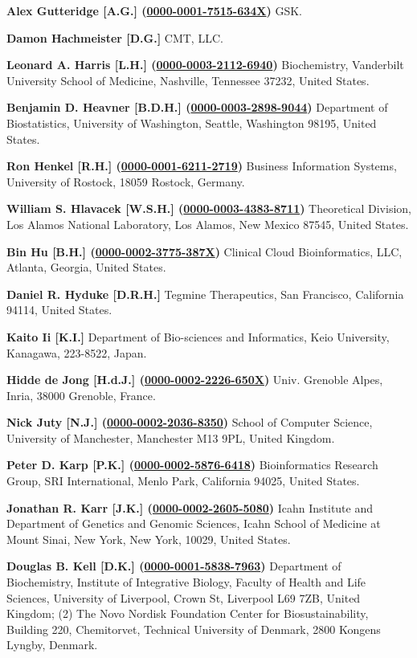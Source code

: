 \documentclass{sbml-paper}
\newcommand{\orcid}[1]{\href{https://orcid.org/#1}{#1}}
\begin{document}
\textbf{Alex Gutteridge [A.G.] (\orcid{0000-0001-7515-634X})} GSK.

\textbf{Damon Hachmeister [D.G.]} CMT, LLC.

\textbf{Leonard A. Harris [L.H.] (\orcid{0000-0003-2112-6940})} Biochemistry, Vanderbilt University School of Medicine, Nashville, Tennessee 37232, United States.

\textbf{Benjamin D. Heavner [B.D.H.] (\orcid{0000-0003-2898-9044})} Department of Biostatistics, University of Washington, Seattle, Washington 98195, United States.

\textbf{Ron Henkel [R.H.] (\orcid{0000-0001-6211-2719})} Business Information Systems, University of Rostock, 18059 Rostock, Germany.

\textbf{William S. Hlavacek [W.S.H.] (\orcid{0000-0003-4383-8711})} Theoretical Division, Los Alamos National Laboratory, Los Alamos, New Mexico 87545, United States.

\textbf{Bin Hu [B.H.] (\orcid{0000-0002-3775-387X})} Clinical Cloud Bioinformatics, LLC, Atlanta, Georgia, United States.

\textbf{Daniel R. Hyduke [D.R.H.]} Tegmine Therapeutics, San Francisco, California 94114, United States.

\textbf{Kaito Ii [K.I.]} Department of Bio-sciences and Informatics, Keio University, Kanagawa, 223-8522, Japan.

\textbf{Hidde de Jong [H.d.J.] (\orcid{0000-0002-2226-650X})} Univ. Grenoble Alpes, Inria, 38000 Grenoble, France.

\textbf{Nick Juty [N.J.] (\orcid{0000-0002-2036-8350})} School of Computer Science, University of Manchester, Manchester M13 9PL, United Kingdom.

\textbf{Peter D. Karp [P.K.] (\orcid{0000-0002-5876-6418})} Bioinformatics Research Group, SRI International, Menlo Park, California 94025, United States.

\textbf{Jonathan R. Karr [J.K.] (\orcid{0000-0002-2605-5080})} Icahn Institute and Department of Genetics and Genomic Sciences, Icahn School of Medicine at Mount Sinai, New York, New York, 10029, United States.

\textbf{Douglas B. Kell [D.K.] (\orcid{0000-0001-5838-7963})} Department of Biochemistry, Institute of Integrative Biology, Faculty of Health and Life Sciences, University of Liverpool, Crown St, Liverpool L69 7ZB, United Kingdom; (2) The Novo Nordisk Foundation Center for Biosustainability, Building 220, Chemitorvet, Technical University of Denmark, 2800 Kongens Lyngby, Denmark.
\end{document}
